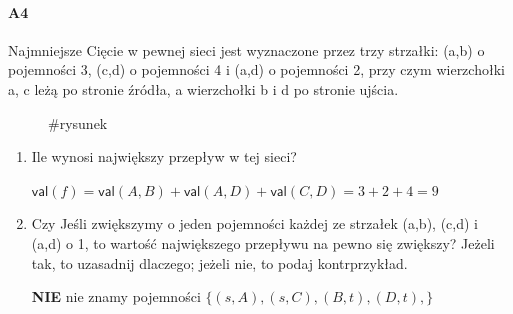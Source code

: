 \documentclass[a4paper,12pt]{article}
\theoremstyle{definition}%
\theoremstyle{definition}
\theoremstyle{problem}
\begin{document}
\paragraph{A4} Najmniejsze Cięcie w pewnej sieci jest wyznaczone przez trzy strzałki: (a,b) o pojemności 3, (c,d) o
pojemności 4 i (a,d) o pojemności 2, przy czym wierzchołki a, c leżą po stronie źródła, a wierzchołki b i d
po stronie ujścia.
\begin{figure}[H]
\centering
{}
\caption*{\#rysunek}
\end{figure}
\begin{enumerate}[label=\alph*)]
\item Ile wynosi największy przepływ w tej sieci?

$\mathsf{val}(f)=\mathsf{val}(A,B)+\mathsf{val}(A,D)+\mathsf{val}(C,D)=3+2+4=9$
\item Czy Jeśli zwiększymy o jeden pojemności każdej ze strzałek (a,b), (c,d) i (a,d) o 1, to wartość największego przepływu na pewno się zwiększy? Jeżeli tak, to uzasadnij dlaczego; jeżeli nie, to podaj kontrprzykład.

\textbf{NIE} nie znamy pojemności $\{(s,A),(s,C),(B,t),(D,t),\}$
\end{enumerate}
\end{document}
